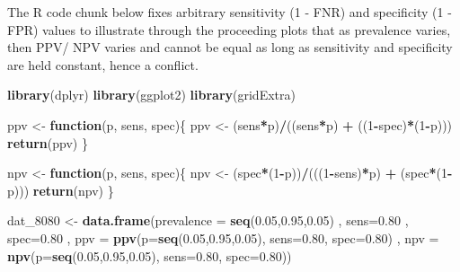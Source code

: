 \documentclass[12pt, twoside]{amherstthesis}
\newenvironment{Shaded}{\begin{snugshade}}{\end{snugshade}}
\newcommand{\AttributeTok}[1]{\textcolor[rgb]{0.13,0.29,0.53}{#1}}
\newcommand{\ControlFlowTok}[1]{\textcolor[rgb]{0.13,0.29,0.53}{\textbf{#1}}}
\newcommand{\DecValTok}[1]{\textcolor[rgb]{0.00,0.00,0.81}{#1}}
\newcommand{\FloatTok}[1]{\textcolor[rgb]{0.00,0.00,0.81}{#1}}
\newcommand{\FunctionTok}[1]{\textcolor[rgb]{0.13,0.29,0.53}{\textbf{#1}}}
\newcommand{\NormalTok}[1]{#1}
\newcommand{\OtherTok}[1]{\textcolor[rgb]{0.56,0.35,0.01}{#1}}
\newcommand{\SpecialCharTok}[1]{\textcolor[rgb]{0.81,0.36,0.00}{\textbf{#1}}}
\begin{document}
\noindent The R code chunk below fixes arbitrary sensitivity (1 - FNR) and specificity (1 - FPR) values to illustrate through the proceeding plots that as prevalence varies, then PPV/ NPV varies and cannot be equal as long as sensitivity and specificity are held constant, hence a conflict.
\begin{Shaded}
\begin{Highlighting}[]
\FunctionTok{library}\NormalTok{(dplyr)}
\FunctionTok{library}\NormalTok{(ggplot2)}
\FunctionTok{library}\NormalTok{(gridExtra)}
\end{Highlighting}
\end{Shaded}
\begin{Shaded}
\begin{Highlighting}[]
\NormalTok{ppv }\OtherTok{\textless{}{-}} \ControlFlowTok{function}\NormalTok{(p, sens, spec)\{}
\NormalTok{  ppv }\OtherTok{\textless{}{-}}\NormalTok{ (sens}\SpecialCharTok{*}\NormalTok{p)}\SpecialCharTok{/}\NormalTok{((sens}\SpecialCharTok{*}\NormalTok{p) }\SpecialCharTok{+}\NormalTok{ ((}\DecValTok{1}\SpecialCharTok{{-}}\NormalTok{spec)}\SpecialCharTok{*}\NormalTok{(}\DecValTok{1}\SpecialCharTok{{-}}\NormalTok{p)))}
  \FunctionTok{return}\NormalTok{(ppv)}
\NormalTok{\}}

\NormalTok{npv }\OtherTok{\textless{}{-}} \ControlFlowTok{function}\NormalTok{(p, sens, spec)\{}
\NormalTok{  npv }\OtherTok{\textless{}{-}}\NormalTok{ (spec}\SpecialCharTok{*}\NormalTok{(}\DecValTok{1}\SpecialCharTok{{-}}\NormalTok{p))}\SpecialCharTok{/}\NormalTok{(((}\DecValTok{1}\SpecialCharTok{{-}}\NormalTok{sens)}\SpecialCharTok{*}\NormalTok{p) }\SpecialCharTok{+}\NormalTok{ (spec}\SpecialCharTok{*}\NormalTok{(}\DecValTok{1}\SpecialCharTok{{-}}\NormalTok{p)))}
  \FunctionTok{return}\NormalTok{(npv)}
\NormalTok{\}}

\NormalTok{dat\_8080 }\OtherTok{\textless{}{-}} \FunctionTok{data.frame}\NormalTok{(}\AttributeTok{prevalence =} \FunctionTok{seq}\NormalTok{(}\FloatTok{0.05}\NormalTok{,}\FloatTok{0.95}\NormalTok{,}\FloatTok{0.05}\NormalTok{)}
\NormalTok{                       , }\AttributeTok{sens=}\FloatTok{0.80}
\NormalTok{                       , }\AttributeTok{spec=}\FloatTok{0.80}
\NormalTok{                       , }\AttributeTok{ppv =} \FunctionTok{ppv}\NormalTok{(}\AttributeTok{p=}\FunctionTok{seq}\NormalTok{(}\FloatTok{0.05}\NormalTok{,}\FloatTok{0.95}\NormalTok{,}\FloatTok{0.05}\NormalTok{), }
                                   \AttributeTok{sens=}\FloatTok{0.80}\NormalTok{, }
                                   \AttributeTok{spec=}\FloatTok{0.80}\NormalTok{)}
\NormalTok{                       , }\AttributeTok{npv =} \FunctionTok{npv}\NormalTok{(}\AttributeTok{p=}\FunctionTok{seq}\NormalTok{(}\FloatTok{0.05}\NormalTok{,}\FloatTok{0.95}\NormalTok{,}\FloatTok{0.05}\NormalTok{), }
                                   \AttributeTok{sens=}\FloatTok{0.80}\NormalTok{, }
                                   \AttributeTok{spec=}\FloatTok{0.80}\NormalTok{))}


\end{Highlighting}
\end{Shaded}
\end{document}
